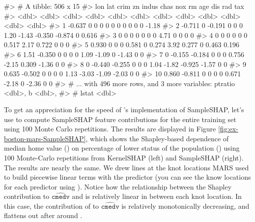 \begin{Schunk}
\begin{Soutput}
#> # A tibble: 506 x 15
#>       lon    lat   crim    zn indus  chas   nox    rm    age    dis   rad    tax
#>     <dbl>  <dbl>  <dbl> <dbl> <dbl> <dbl> <dbl> <dbl>  <dbl>  <dbl> <dbl>  <dbl>
#>  1 -0.637  0      0         0 0         0 0      0     0      0     0     -1.18 
#>  2 -0.711  0     -0.191     0 0         0 1.20  -1.43 -0.350 -0.874 0      0.616
#>  3  0      0      0         0 0         0 0      4.71  0      0     0      0    
#>  4  0      0      0         0 0         0 0.517  2.17  0.722  0     0      0    
#>  5  0.930  0      0         0 0.581     0 0.274  3.92  0.277  0     0.463  0.196
#>  6  1.51  -0.350  0         0 0         0 1.09  -1.09  0     -1.43  0      0    
#>  7  0     -0.155 -0.184     0 0         0 0.756 -2.15  0.309 -1.36  0      0    
#>  8  0     -0.440 -0.255     0 0         0 1.04  -1.82 -0.925 -1.57  0      0    
#>  9  0.635 -0.502  0         0 0         0 1.13  -3.03 -1.09  -2.03  0      0    
#> 10  0.860 -0.811  0         0 0         0 0.671 -2.18  0     -2.36  0      0    
#> # ... with 496 more rows, and 3 more variables: ptratio <dbl>, b <dbl>,
#> #   lstat <dbl>
\end{Soutput}
\end{Schunk}

To get an appreciation for the speed of 's implementation
of SampleSHAP, let's use  to compute
SampleSHAP feature contributions for the entire training set using 100
Monte Carlo repetitions. The results are displayed in Figure
\ref{fig:ex-boston-mars-SampleSHAP}, which shows the Shapley-based
dependence of median home value () on percentage of lower
status of the population () using 100 Monte-Carlo
repetitions from KernelSHAP (left) and SampleSHAP (right). The results
are nearly the same. We drew lines at the knot locations MARS used to
build piecewise linear terms with the  predictor (you can
see the know locations for each predictor using
). Notice how the relationship between the
Shapley contribution to \(\widehat{\mathtt{cmedv}}\) and  is
relatively linear in between each knot location. In this case, the
contribution of  to \(\widehat{\mathtt{cmedv}}\) is
relatively monotonically decreasing, and flattens out after around
.

